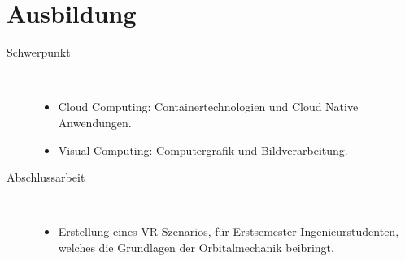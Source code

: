 \section{Ausbildung}
\begin{description}
    \item[Schwerpunkt]~
    \begin{itemize}[labelindent=\parindent, leftmargin=*]
        \item Cloud Computing: Containertechnologien und Cloud Native Anwendungen.
        \item Visual Computing: Computergrafik und Bildverarbeitung.
    \end{itemize}
    \item[Abschlussarbeit]~
    \begin{itemize}[labelindent=\parindent, leftmargin=*]
        \item Erstellung eines VR-Szenarios, für Erstsemester-Ingenieurstudenten, welches die Grundlagen der Orbitalmechanik beibringt.
    \end{itemize}
\end{description}
